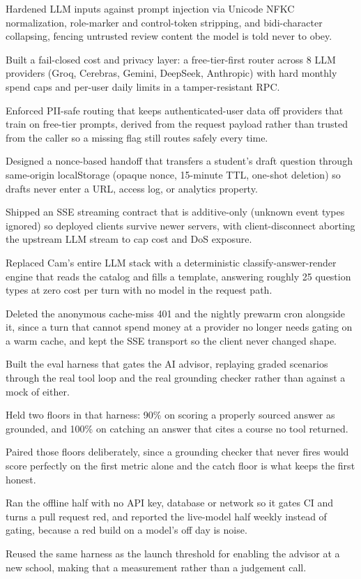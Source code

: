 \documentclass[letterpaper,11pt]{article}
\newcommand{\resumeItem}[1]{
  \item\small{
    {#1 \vspace{-2pt}}
  }
}
\begin{document}
            \resumeItem{Hardened LLM inputs against prompt injection via Unicode NFKC normalization, role-marker and control-token stripping, and bidi-character collapsing, fencing untrusted review content the model is told never to obey.}
            \resumeItem{Built a fail-closed cost and privacy layer: a free-tier-first router across 8 LLM providers (Groq, Cerebras, Gemini, DeepSeek, Anthropic) with hard monthly spend caps and per-user daily limits in a tamper-resistant RPC.}
            \resumeItem{Enforced PII-safe routing that keeps authenticated-user data off providers that train on free-tier prompts, derived from the request payload rather than trusted from the caller so a missing flag still routes safely every time.}
            \resumeItem{Designed a nonce-based handoff that transfers a student's draft question through same-origin localStorage (opaque nonce, 15-minute TTL, one-shot deletion) so drafts never enter a URL, access log, or analytics property.}
            \resumeItem{Shipped an SSE streaming contract that is additive-only (unknown event types ignored) so deployed clients survive newer servers, with client-disconnect aborting the upstream LLM stream to cap cost and DoS exposure.}
            \resumeItem{Replaced Cam's entire LLM stack with a deterministic classify-answer-render engine that reads the catalog and fills a template, answering roughly 25 question types at zero cost per turn with no model in the request path.}
            \resumeItem{Deleted the anonymous cache-miss 401 and the nightly prewarm cron alongside it, since a turn that cannot spend money at a provider no longer needs gating on a warm cache, and kept the SSE transport so the client never changed shape.}
            \resumeItem{Built the eval harness that gates the AI advisor, replaying graded scenarios through the real tool loop and the real grounding checker rather than against a mock of either.}
            \resumeItem{Held two floors in that harness: 90\% on scoring a properly sourced answer as grounded, and 100\% on catching an answer that cites a course no tool returned.}
            \resumeItem{Paired those floors deliberately, since a grounding checker that never fires would score perfectly on the first metric alone and the catch floor is what keeps the first honest.}
            \resumeItem{Ran the offline half with no API key, database or network so it gates CI and turns a pull request red, and reported the live-model half weekly instead of gating, because a red build on a model's off day is noise.}
            \resumeItem{Reused the same harness as the launch threshold for enabling the advisor at a new school, making that a measurement rather than a judgement call.}
\end{document}
